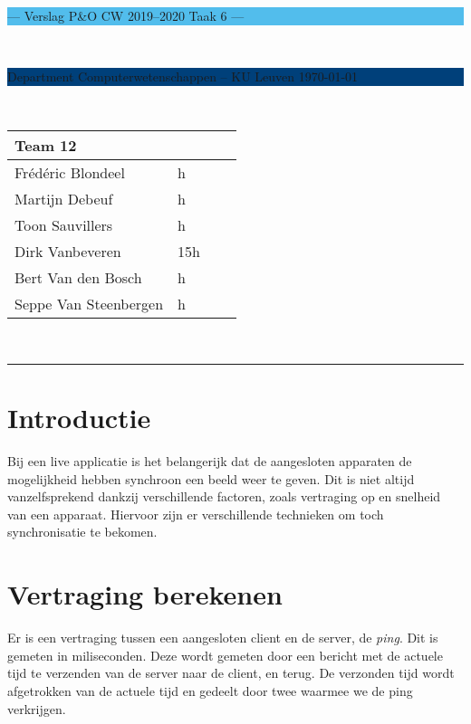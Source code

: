 \documentclass[a4paper,11pt]{article}
\begin{document}
\noindent
\colorbox[HTML]{52BDEC}{\bfseries\parbox{\textwidth}{\centering\large
  --- Verslag P\&O CW 2019--2020 Taak 6 ---
}}
\\[-1mm]
\colorbox[HTML]{00407A}{\bfseries\color{white}\parbox{\textwidth}{
  Department Computerwetenschappen -- KU Leuven
  \hfill
  \today
}}
\\

\smallskip

\noindent

\begin{tabular}{*4l}
\toprule
\multicolumn{2}{l}{\large\textbf{Team 12}} \\
\midrule
Frédéric Blondeel & h \\
Martijn Debeuf & h \\
Toon Sauvillers & h \\ %
Dirk Vanbeveren & 15h \\
Bert Van den Bosch & h \\
Seppe Van Steenbergen & h \\


\bottomrule
\hline
\end{tabular}\\

\noindent
{\color[HTML]{52BDEC} \rule{\linewidth}{1mm} }
\tableofcontents
\newpage
\section{Introductie}\label{sec:introductie}

Bij een live applicatie is het belangerijk dat de aangesloten apparaten de mogelijkheid hebben synchroon een beeld weer te geven. Dit is niet altijd vanzelfsprekend dankzij verschillende factoren, zoals vertraging op en snelheid van een apparaat. Hiervoor zijn er verschillende technieken om toch synchronisatie te bekomen.

\section{Vertraging berekenen}
Er is een vertraging tussen een aangesloten client en de server, de {\it ping}. Dit is gemeten in miliseconden.
Deze wordt gemeten door een bericht met de actuele tijd te verzenden van de server naar de client, en terug. De verzonden tijd wordt afgetrokken van de actuele tijd en gedeelt door twee waarmee we de ping verkrijgen.
\end{document}
